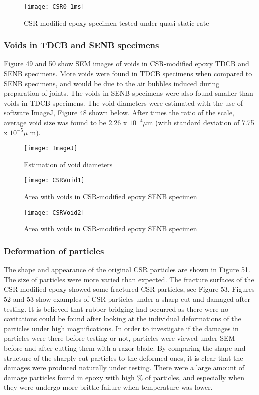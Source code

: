 \documentclass[numbers=noendperiod,chapterprefix=on]{icldt} %
\begin{document}
\begin{figure}[!htpb]
\centering
\texttt{[image: CSR0\_1ms]}
\caption{CSR-modified epoxy specimen tested under quasi-static rate }
\end{figure}
\FloatBarrier

\subsubsection{Voids in TDCB and SENB specimens}
Figure 49 and 50 show SEM images of voids in CSR-modified epoxy TDCB and SENB specimens. More voids were found in TDCB specimens when compared to SENB specimens, and would be due to the air bubbles induced during preparation of joints. The voids in SENB specimens were also found smaller than voids in TDCB specimens. 
The void diameters were estimated with the use of software ImageJ, Figure 48 shown below. After times the ratio of the scale, average void size was found to be 2.26 x $10^{-4}\mu$m (with standard deviation of 7.75 x $10^{-5}\mu$ m).

\begin{figure}[!htpb]
\centering
\texttt{[image: ImageJ]}
\caption{Estimation of void diameters}
\end{figure}
\FloatBarrier

\begin{figure}[!htpb]
\centering
\texttt{[image: CSRVoid1]}
\caption{Area with voids in CSR-modified epoxy SENB specimen}
\end{figure}
\FloatBarrier

\begin{figure}[!htpb]
\centering
\texttt{[image: CSRVoid2]}
\caption{Area with voids in CSR-modified epoxy SENB specimen}
\end{figure}
\FloatBarrier

\subsubsection{Deformation of particles}
The shape and appearance of the original CSR particles are shown in Figure 51. The size of particles were more varied than expected. The fracture surfaces of the CSR-modified epoxy showed some fractured CSR particles, see Figure 53. Figures 52 and 53 show examples of CSR particles under a sharp cut and damaged after testing. It is believed that rubber bridging had occurred as there were no cavitations could be found after looking at the individual deformations of the particles under high magnifications. In order to investigate if the damages in particles were there before testing or not, particles were viewed under SEM before and after cutting them with a razor blade. By comparing the shape and structure of the sharply cut particles to the deformed ones, it is clear that the damages were produced naturally under testing. There were a large amount of damage particles found in epoxy with high \% of particles, and especially when they were undergo more brittle failure when temperature was lower.
\end{document}
